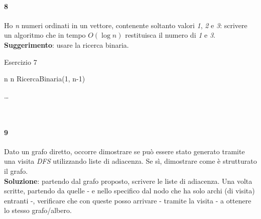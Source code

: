 \paragraph{8}
Ho \textit{n} numeri ordinati in un vettore, contenente soltanto valori \textit{1}, \textit{2} e \textit{3}: scrivere un algoritmo che in tempo $O(\log{n})$ restituisca il numero di \textit{1} e \textit{3}. \\
\textbf{Suggerimento}: usare la ricerca binaria.
\begin{algorithm}
	\caption{Esercizio 7}\label{alg:es8}
	\begin{algorithmic}[1]
		\Return n
		\EndIf
		\Return n
		\EndIf
		\Return RicercaBinaria(1, n-1)
		\EndFunction
	\end{algorithmic}
	\begin{algorithmic}[1]
		\State \ldots
		\EndFunction
	\end{algorithmic}
\end{algorithm} \\ \hfill

\paragraph{9}
Dato un grafo diretto, occorre dimostrare se può essere stato generato tramite una visita \textit{DFS} utilizzando liste di adiacenza. Se sì, dimostrare come è strutturato il grafo. \\
\textbf{Soluzione}: partendo dal grafo proposto, scrivere le liste di adiacenza. Una volta scritte, partendo da quelle - e nello specifico dal nodo che ha solo archi (di visita) entranti -, verificare che con queste posso arrivare - tramite la visita - a ottenere lo stesso grafo/albero.